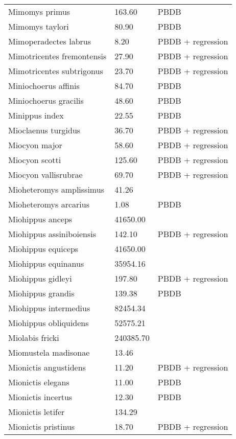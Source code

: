 \begin{longtable}{p{} p{} p{}}
    Mimomys primus & 163.60 & PBDB \\ 
    Mimomys taylori & 80.90 & PBDB \\ 
    Mimoperadectes labrus & 8.20 & PBDB + regression \\ 
    Mimotricentes fremontensis & 27.90 & PBDB + regression \\ 
    Mimotricentes subtrigonus & 23.70 & PBDB + regression \\ 
    Miniochoerus affinis & 84.70 & PBDB \\ 
    Miniochoerus gracilis & 48.60 & PBDB \\ 
    Minippus index & 22.55 & PBDB \\ 
    Mioclaenus turgidus & 36.70 & PBDB + regression \\ 
    Miocyon major & 58.60 & PBDB + regression \\ 
    Miocyon scotti & 125.60 & PBDB + regression \\ 
    Miocyon vallisrubrae & 69.70 & PBDB + regression \\ 
    Mioheteromys amplissimus & 41.26 & \cite{Tomiya2013} \\ 
    Mioheteromys arcarius & 1.08 & PBDB \\ 
    Miohippus anceps & 41650.00 & \cite{McKenna2011} \\ 
    Miohippus assiniboiensis & 142.10 & PBDB + regression \\ 
    Miohippus equiceps & 41650.00 & \cite{McKenna2011} \\ 
    Miohippus equinanus & 35954.16 & \cite{Tomiya2013} \\ 
    Miohippus gidleyi & 197.80 & PBDB + regression \\ 
    Miohippus grandis & 139.38 & PBDB \\ 
    Miohippus intermedius & 82454.34 & \cite{Tomiya2013} \\ 
    Miohippus obliquidens & 52575.21 & \cite{Tomiya2013} \\ 
    Miolabis fricki & 240385.70 & \cite{Tomiya2013} \\ 
    Miomustela madisonae & 13.46 & \cite{Tomiya2013} \\ 
    Mionictis angustidens & 11.20 & PBDB + regression \\ 
    Mionictis elegans & 11.00 & PBDB \\ 
    Mionictis incertus & 12.30 & PBDB \\ 
    Mionictis letifer & 134.29 & \cite{Tomiya2013} \\ 
    Mionictis pristinus & 18.70 & PBDB + regression \\ 

\end{longtable}
